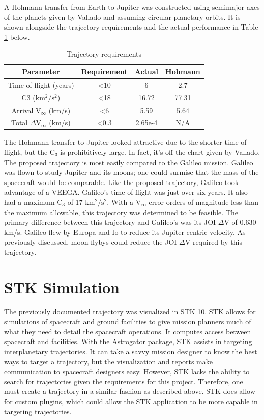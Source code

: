 \documentclass[]{aiaa-tc}%
\begin{document}
A Hohmann transfer from Earth to Jupiter was constructed using semimajor axes of the planets given by Vallado\cite{Vallado} and assuming circular planetary orbits. It is shown alongside the trajectory requirements and the actual performance in Table \ref{TrajReqs} below. 
\begin{table}[H]
\centering
\caption{Trajectory requirements}
\label{TrajReqs}
\begin{tabular}{|c|c|c|c|}
\hline
\rowcolor[HTML]{C0C0C0} 
\textbf{Parameter}     & \textbf{Requirement} & \textbf{Actual}& \textbf{Hohmann} \\ \hline
Time of flight (years) & \textless10          & 6       & 2.7        \\ \hline
C3 ($\mathrm{km^2/s^2}$)              & \textless18          & 16.72     & 77.31      \\ \hline
Arrival V$_\infty$ (km/s)       & \textless6           & 5.59       & 5.64     \\ \hline
Total $\Delta$V$_\infty$ (km/s)         & \textless0.3           & 2.65e-4    & N/A     \\ \hline
\end{tabular}
\end{table}
The Hohmann transfer to Jupiter looked attractive due to the shorter time of flight, but the C$_3$ is prohibitively large. In fact, it's off the chart given by Vallado\cite{Vallado}. The proposed trajectory is most easily compared to the Galileo mission. Galileo was flown to study Jupiter and its moons; one could surmise that the mass of the spacecraft would be comparable. Like the proposed trajectory, Galileo took advantage of a VEEGA. Galileo's time of flight was just over six years. It also had a maximum C$_3$ of 17 $\mathrm{km^2/s^2}$\cite{Damario}. With a V$_\infty$ error orders of magnitude less than the maximum allowable, this trajectory was determined to be feasible. The primary difference between this trajectory and Galileo's was its JOI $\Delta$V of 0.630 km/s.  Galileo flew by Europa and Io to reduce its Jupiter-centric velocity. As previously  discussed, moon flybys could reduce the JOI $\Delta$V required by this trajectory.

	\section{STK Simulation}
The previously documented trajectory was visualized in STK 10. STK allows for simulations of spacecraft and ground facilities to give mission planners much of what they need to detail the spacecraft operations. It computes access between spacecraft and facilities. With the Astrogator package, STK assists in targeting interplanetary trajectories. It can take a savvy mission designer to know the best ways to target a trajectory, but the visualization and reports make communication to spacecraft designers easy. However, STK lacks the ability to search for trajectories given the requirements for this project. Therefore, one must create a trajectory in a similar fashion as described above. STK does allow for custom plugins, which could allow the STK application to be more capable in targeting trajectories. 
	
\end{document}
